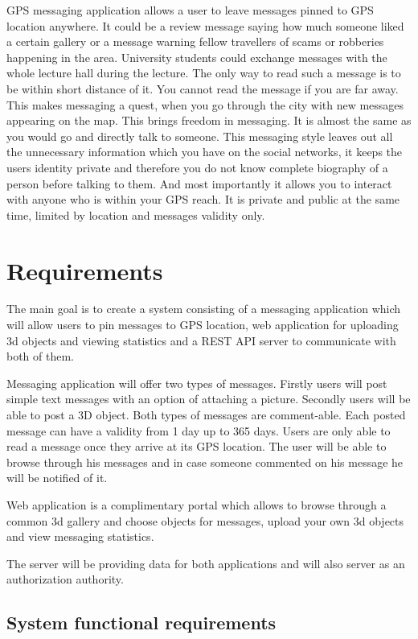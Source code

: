 \documentclass[thesis=M,english]{FITthesis}[2012/10/20]
\begin{document}
GPS messaging application allows a user to leave messages pinned to GPS location anywhere. It could be a review message saying how much someone liked a certain gallery or a message warning fellow travellers of scams or robberies happening in the area. University students could exchange messages with the whole lecture hall during the lecture. The only way to read such a message is to be within short distance of it. You cannot read the message if you are far away. This makes messaging a quest, when you go through the city with new messages appearing on the map. This brings freedom in messaging. It is almost the same as you would go and directly talk to someone. This messaging style leaves out all the unnecessary information which you have on the social networks, it keeps the users identity private and therefore you do not know complete biography of a person before talking to them. And most importantly it allows you to interact with anyone who is within your GPS reach. It is private and public at the same time, limited by location and messages validity only.

\chapter{Requirements}

The main goal is to create a system consisting of a messaging application which will allow users to pin messages to GPS location, web application for uploading 3d objects and viewing statistics and a REST API server to communicate with both of them. 

Messaging application will offer two types of messages. Firstly users will post simple text messages with an option of attaching a picture. Secondly users will be able to post a 3D object. Both types of messages are comment-able. Each posted message can have a validity from 1 day up to 365 days. Users are only able to read a message once they arrive at its GPS location. The user will be able to browse through his messages and in case someone commented on his message he will be notified of it. 

Web application is a complimentary portal which allows to browse through a common 3d gallery and choose objects for messages, upload your own 3d objects and view messaging statistics.

The server will be providing data for both applications and will also server as an authorization authority.

\section{System functional requirements}
\end{document}
